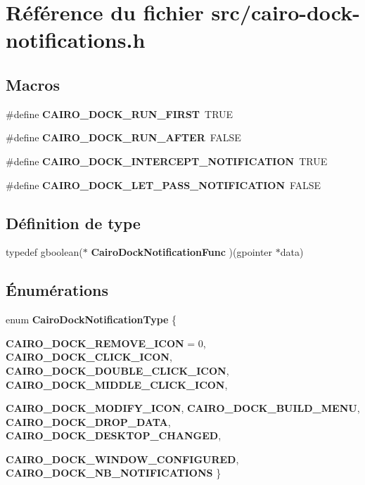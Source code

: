 \section{Référence du fichier src/cairo-dock-notifications.h}
\label{cairo-dock-notifications_8h}
\subsection*{Macros}
\begin{CompactItemize}
\item 
\#define {\bf CAIRO\_\-DOCK\_\-RUN\_\-FIRST}~TRUE
\item 
\#define {\bf CAIRO\_\-DOCK\_\-RUN\_\-AFTER}~FALSE
\item 
\#define {\bf CAIRO\_\-DOCK\_\-INTERCEPT\_\-NOTIFICATION}~TRUE
\item 
\#define {\bf CAIRO\_\-DOCK\_\-LET\_\-PASS\_\-NOTIFICATION}~FALSE
\end{CompactItemize}
\subsection*{Définition de type}
\begin{CompactItemize}
\item 
typedef gboolean($\ast$ {\bf CairoDockNotificationFunc} )(gpointer $\ast$data)
\end{CompactItemize}
\subsection*{Énumérations}
\begin{CompactItemize}
\item 
enum {\bf CairoDockNotificationType} \{ \par
{\bf CAIRO\_\-DOCK\_\-REMOVE\_\-ICON} = 0, 
{\bf CAIRO\_\-DOCK\_\-CLICK\_\-ICON}, 
{\bf CAIRO\_\-DOCK\_\-DOUBLE\_\-CLICK\_\-ICON}, 
{\bf CAIRO\_\-DOCK\_\-MIDDLE\_\-CLICK\_\-ICON}, 
\par
{\bf CAIRO\_\-DOCK\_\-MODIFY\_\-ICON}, 
{\bf CAIRO\_\-DOCK\_\-BUILD\_\-MENU}, 
{\bf CAIRO\_\-DOCK\_\-DROP\_\-DATA}, 
{\bf CAIRO\_\-DOCK\_\-DESKTOP\_\-CHANGED}, 
\par
{\bf CAIRO\_\-DOCK\_\-WINDOW\_\-CONFIGURED}, 
{\bf CAIRO\_\-DOCK\_\-NB\_\-NOTIFICATIONS}
 \}
\end{CompactItemize}
